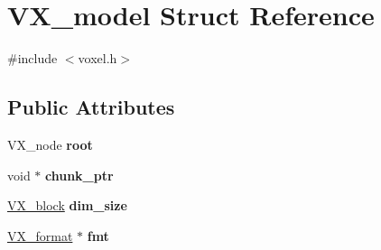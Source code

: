 \hypertarget{structVX__model}{\section{V\-X\-\_\-model Struct Reference}
\label{structVX__model}
}


{\ttfamily \#include $<$voxel.\-h$>$}

\subsection*{Public Attributes}
\begin{DoxyCompactItemize}
\item 
\hypertarget{structVX__model_a7a676bd51b944cbe0eab4f8bb88a1bd6}{V\-X\-\_\-node {\bfseries root}}\label{structVX__model_a7a676bd51b944cbe0eab4f8bb88a1bd6}

\item 
\hypertarget{structVX__model_a1ef022d1d8eb8e99a51b1300dbdc60f5}{void $\ast$ {\bfseries chunk\-\_\-ptr}}\label{structVX__model_a1ef022d1d8eb8e99a51b1300dbdc60f5}

\item 
\hypertarget{structVX__model_a9b12c95af94b719583f49aa477b40b82}{\hyperlink{structVX__block}{V\-X\-\_\-block} {\bfseries dim\-\_\-size}}\label{structVX__model_a9b12c95af94b719583f49aa477b40b82}

\item 
\hypertarget{structVX__model_aa220cee06d8f6f6d6af664ab58852b3b}{\hyperlink{structVX__format}{V\-X\-\_\-format} $\ast$ {\bfseries fmt}}\label{structVX__model_aa220cee06d8f6f6d6af664ab58852b3b}


\end{DoxyCompactItemize}
